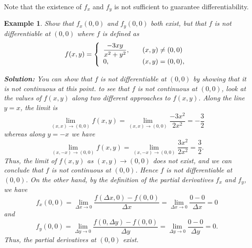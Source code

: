 \documentclass[titlepage,a4paper,12pt]{report}
\newtheorem{example}{Example}[section]
\begin{document}
\noindent Note that the existence of $f_x$ and $f_y$ is not sufficient to guarantee differentiability.
\begin{example}
Show that $f_x(0,0)$ and $f_y(0,0)$ both exist, but that $f$ is not differentiable at $(0,0)$ where $f$ is defined as 
\[f(x,y) = \left\{ 
\begin{array}{l l}
  \dfrac{-3xy}{x^2+y^2}, & \quad (x,y)\neq (0,0)\\
  0, & \quad (x,y)=(0,0),\\ \end{array} \right. \]

\noindent \textbf{Solution:} You can show that $f$ is not differentiable at $(0,0)$ by showing that it is not continuous at this point. to see that $f $ is not continuous at $(0,0)$, look at the values of $f(x,y)$ along two different approaches to $f(x,y)$. Along the line $y=x$, the limit is 
\[\lim _{(x,x)\rightarrow (0,0)}f(x,y)=\lim _{(x,x)\rightarrow (0,0)}\dfrac{-3x^2}{2x^2}=-\dfrac{3}{2}\]
whereas along $y=-x$ we have 
\[\lim _{(x,-x)\rightarrow (0,0)}f(x,y)=\lim _{(x,-x)\rightarrow (0,0)}\dfrac{3x^2}{2x^2}=\dfrac{3}{2}.\] 
Thus, the limit of $f(x,y)$ as $(x,y)\rightarrow (0,0)$ does not exist, and we can conclude that $f$ is not continuous at $(0,0)$. Hence $f $ is not differentiable at $(0,0)$. On the other hand, by the definition of the partial derivatives $f_x$ and $f_y$, we have 
\[f_x(0,0)=\lim _{\Delta x\rightarrow 0}\dfrac{f(\Delta  x, 0)-f(0,0)}{\Delta  x}=\lim _{\Delta  x\rightarrow 0}\dfrac{0-0}{\Delta  x}=0\] and 
\[f_y(0,0)=\lim _{\Delta y\rightarrow 0}\dfrac{f(0, \Delta y)-f(0,0)}{\Delta  y}=\lim _{\Delta  y\rightarrow 0}\dfrac{0-0}{\Delta  y}=0.\] Thus, the partial derivatives at $(0,0)$ exist.
\end{example}
\end{document}
